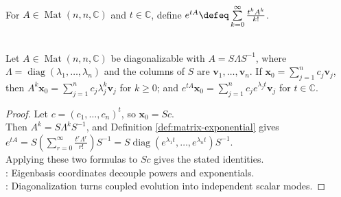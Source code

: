 \begin{definition} \label{def:matrix-exponential} \\
For $A\in\operatorname{Mat}(n,n,\mathbb{C})$ and $t\in\mathbb{C}$, define $e^{tA}\defeq\sum\limits_{k=0}^{\infty}\frac{t^kA^k}{k!}$.
\end{definition}

\begin{proposition} \label{prop:diagonalizable-pure-modes-powers-exponentials} \\
Let $A\in\operatorname{Mat}(n,n,\mathbb{C})$ be diagonalizable with $A=S\Lambda S^{-1}$, where $\Lambda=\operatorname{diag}(\lambda_1,\ldots,\lambda_n)$ and the columns of $S$ are $\mathbf{v}_1,\ldots,\mathbf{v}_n$. If $\mathbf{x}_0=\sum\limits_{j=1}^n c_j\mathbf{v}_j$, then $A^k\mathbf{x}_0=\sum\limits_{j=1}^n c_j\lambda_j^k\mathbf{v}_j$ for $k\geq0$; and $e^{tA}\mathbf{x}_0=\sum\limits_{j=1}^n c_j e^{\lambda_jt}\mathbf{v}_j$ for $t\in\mathbb{C}$.
\begin{proof}
Let $c=(c_1,\ldots,c_n)^t$, so $\mathbf{x}_0=Sc$.\\
Then $A^k=S\Lambda^kS^{-1}$, and Definition \ref{def:matrix-exponential} gives $e^{tA}=S\left(\sum\limits_{r=0}^{\infty}\frac{t^r\Lambda^r}{r!}\right)S^{-1} =S\operatorname{diag}(e^{\lambda_1t},\ldots,e^{\lambda_nt})S^{-1}$.\\
Applying these two formulas to $Sc$ gives the stated identities.\\
: Eigenbasis coordinates decouple powers and exponentials.\\
: Diagonalization turns coupled evolution into independent scalar modes.
\end{proof}
\end{proposition}

